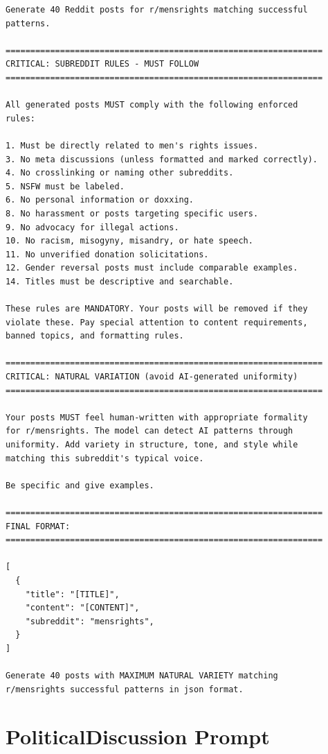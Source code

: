 \begin{small}
\begin{verbatim}
Generate 40 Reddit posts for r/mensrights matching successful 
patterns.

================================================================
CRITICAL: SUBREDDIT RULES - MUST FOLLOW
================================================================

All generated posts MUST comply with the following enforced 
rules:

1. Must be directly related to men's rights issues.
3. No meta discussions (unless formatted and marked correctly).
4. No crosslinking or naming other subreddits.
5. NSFW must be labeled.
6. No personal information or doxxing.
8. No harassment or posts targeting specific users.
9. No advocacy for illegal actions.
10. No racism, misogyny, misandry, or hate speech.
11. No unverified donation solicitations.
12. Gender reversal posts must include comparable examples.
14. Titles must be descriptive and searchable.

These rules are MANDATORY. Your posts will be removed if they 
violate these. Pay special attention to content requirements, 
banned topics, and formatting rules.

================================================================
CRITICAL: NATURAL VARIATION (avoid AI-generated uniformity)
================================================================

Your posts MUST feel human-written with appropriate formality 
for r/mensrights. The model can detect AI patterns through 
uniformity. Add variety in structure, tone, and style while 
matching this subreddit's typical voice.

Be specific and give examples.

================================================================
FINAL FORMAT:
================================================================

[
  {
    "title": "[TITLE]",
    "content": "[CONTENT]",
    "subreddit": "mensrights",
  }
]

Generate 40 posts with MAXIMUM NATURAL VARIETY matching 
r/mensrights successful patterns in json format.
\end{verbatim}
\end{small}

\section{PoliticalDiscussion Prompt}

